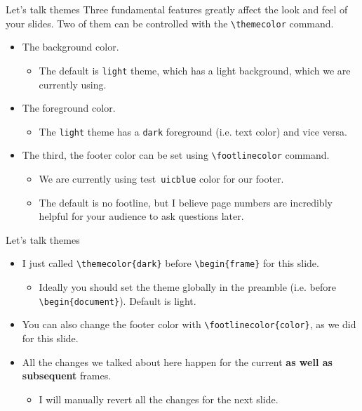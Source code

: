 \documentclass{beamer}
\newcommand{\testcolor}[1]{\colorbox{#1}{\textcolor{#1}{test}}~\texttt{#1}}
\begin{document}
\begin{frame}[fragile]{Let's talk themes}
Three fundamental features greatly affect the look and feel of your slides. Two of them can be controlled with the \verb|\themecolor| command.
\begin{itemize}
\item The background color.
\begin{itemize}
    \item The default is \verb|light| theme, which has a light background, which we are currently using.
\end{itemize}
\item The foreground color.
\begin{itemize}
    \item The \verb|light| theme has a \verb|dark| foreground (i.e. text color) and vice versa.
\end{itemize}
\item The third, the footer color can be set using \verb|\footlinecolor| command.
\begin{itemize}
    \item We are currently using \testcolor{uicblue} color for our footer.
    \item The default is no footline, but I believe page numbers are incredibly helpful for your audience to ask questions later.
\end{itemize}
\end{itemize}
\end{frame}


\begin{frame}[fragile]{Let's talk themes}
\begin{itemize}
\item I just called \verb|\themecolor{dark}| before \verb|\begin{frame}| for this slide.
\begin{itemize}
    \item Ideally you should set the theme globally in the preamble (i.e. before \verb|\begin{document}|). Default is light.
\end{itemize}
\item You can also change the footer color with \verb|\footlinecolor{color}|, as we did for this slide.
\item All the changes we talked about here happen for the current \textbf{as well as subsequent} frames.
\begin{itemize}
    \item I will manually revert all the changes for the next slide.
\end{itemize}
\end{itemize}
\end{frame}
\end{document}
